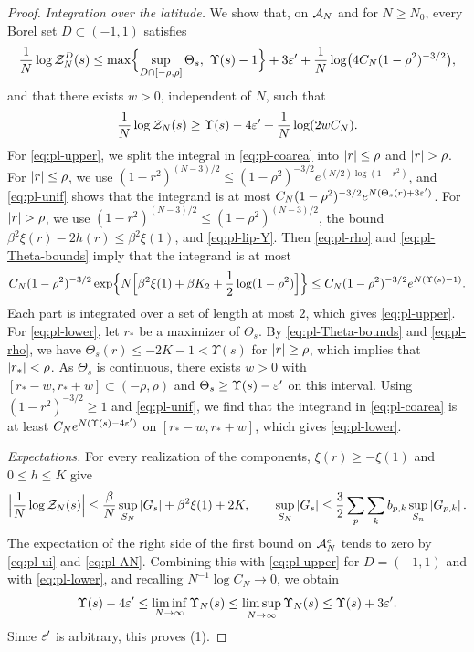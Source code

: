 \begin{proof}
\emph{Integration over the latitude.} We show that, on $\mathcal A_N$ and for $N\ge N_0$, every Borel set $D\subset(-1,1)$ satisfies
\begin{equation}\label{eq:pl-upper}
\frac1N\log\mathcal Z_N^D(s)\le\max\Bigl\{\sup_{D\cap[-\rho,\rho]}\Theta_s,\ \Upsilon(s)-1\Bigr\}+3\eps'+\frac1N\log\bigl(4C_N(1-\rho^2)^{-3/2}\bigr),
\end{equation}
and that there exists $w>0$, independent of $N$, such that
\begin{equation}\label{eq:pl-lower}
\frac1N\log\mathcal Z_N(s)\ge\Upsilon(s)-4\varepsilon'+\frac1N\log(2wC_N).
\end{equation}
For \eqref{eq:pl-upper}, we split the integral in \eqref{eq:pl-coarea} into $\left|r\right|\le\rho$ and $\abs r>\rho$. For $\left|r\right|\le\rho$, we use $(1-r^2)^{(N-3)/2}\le(1-\rho^2)^{-3/2}e^{(N/2)\log(1-r^2)}$, and \eqref{eq:pl-unif} shows that the integrand is at most $C_N(1-\rho^2)^{-3/2}e^{N(\Theta_s(r)+3\varepsilon')}$. For $\abs r>\rho$, we use $(1-r^2)^{(N-3)/2}\le(1-\rho^2)^{(N-3)/2}$, the bound $\beta^2\xi(r)-2h(r)\le\beta^2\xi(1)$, and \eqref{eq:pl-lip-Y}. Then \eqref{eq:pl-rho} and \eqref{eq:pl-Theta-bounds} imply that the integrand is at most
\[
C_N(1-\rho^2)^{-3/2}\exp\Bigl\{N\Bigl[\beta^2\xi(1)+\beta K_2+\frac12\log(1-\rho^2)\Bigr]\Bigr\}\le C_N(1-\rho^2)^{-3/2}e^{N(\Upsilon(s)-1)}.
\]
Each part is integrated over a set of length at most $2$, which gives \eqref{eq:pl-upper}. For \eqref{eq:pl-lower}, let $r_*$ be a maximizer of $\Theta_s$. By \eqref{eq:pl-Theta-bounds} and \eqref{eq:pl-rho}, we have $\Theta_s(r)\le-2K-1<\Upsilon(s)$ for $\left|r\right|\ge\rho$, which implies that $\left|r_*\right|<\rho$. As $\Theta_s$ is continuous, there exists $w>0$ with $[r_*-w,r_*+w]\subset(-\rho,\rho)$ and $\Theta_s\ge\Upsilon(s)-\varepsilon'$ on this interval. Using $(1-r^2)^{-3/2}\ge1$ and \eqref{eq:pl-unif}, we find that the integrand in \eqref{eq:pl-coarea} is at least $C_Ne^{N(\Upsilon(s)-4\varepsilon')}$ on $[r_*-w,r_*+w]$, which gives \eqref{eq:pl-lower}.

\emph{Expectations.} For every realization of the components, $\xi(r)\ge-\xi(1)$ and $0\le h\le K$ give
\begin{equation}\label{eq:pl-crude}
\Bigl|\frac1N\log\mathcal Z_N(s)\Bigr|\le\frac\beta N\sup_{S_N}\left|G_s\right|+\beta^2\xi(1)+2K,
\qquad
\sup_{S_N}\left|G_s\right|\le\frac32\sum_p\sum_kb_{p,k}\sup_{S_n}\left|G_{p,k}\right|.
\end{equation}
The expectation of the right side of the first bound on $\mathcal A_N^c$ tends to zero by \eqref{eq:pl-ui} and \eqref{eq:pl-AN}. Combining this with \eqref{eq:pl-upper} for $D=(-1,1)$ and with \eqref{eq:pl-lower}, and recalling $N^{-1}\log C_N\to0$, we obtain
\[
\Upsilon(s)-4\varepsilon'\le\liminf_{N\to\infty}\Upsilon_N(s)\le\limsup_{N\to\infty}\Upsilon_N(s)\le\Upsilon(s)+3\varepsilon'.
\]
Since $\varepsilon'$ is arbitrary, this proves (1).


\end{proof}
